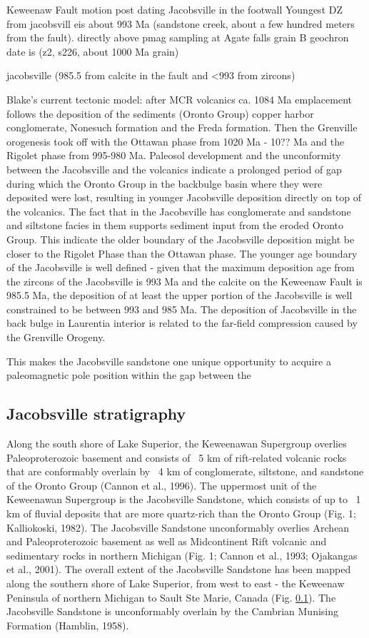\documentclass[11pt,letterpaper]{article}
\begin{document}
Keweenaw Fault motion post dating Jacobsville in the footwall
Youngest DZ from jacobsvill eis about 993 Ma (sandstone creek, about a few hundred meters from the fault). 
directly above pmag sampling at Agate falls grain B geochron date is (z2, s226, about 1000 Ma grain)

jacobsville (985.5 from calcite in the fault and <993 from zircons) 

Blake's current tectonic model: after MCR volcanics ca. 1084 Ma emplacement follows the deposition of the sediments (Oronto Group) copper harbor conglomerate, Nonesuch formation and the Freda formation. Then the Grenville orogenesis took off with the Ottawan phase from 1020 Ma - 10?? Ma and the Rigolet phase from 995-980 Ma. Paleosol development and the unconformity between the Jacobsville and the volcanics indicate a prolonged period of gap during which the Oronto Group in the backbulge basin where they were deposited were lost, resulting in younger Jacobsville deposition directly on top of the volcanics. The fact that in the Jacobsville has conglomerate and sandstone and siltstone facies in them supports sediment input from the eroded Oronto Group. This indicate the older boundary of the Jacobsville deposition might be closer to the Rigolet Phase than the Ottawan phase. The younger age boundary of the Jacobsville is well defined - given that the maximum deposition age from the zircons of the Jacobsville is 993 Ma and the calcite on the Keweenaw Fault is 985.5 Ma, the deposition of at least the upper portion of the Jacobsville is well constrained to be between 993 and 985 Ma. The deposition of Jacobsville in the back bulge in Laurentia interior is related to the far-field compression caused by the Grenville Orogeny. 

This makes the Jacobsville sandstone one unique opportunity to acquire a paleomagnetic pole position within the gap between the 

\subsection{Jacobsville stratigraphy}

Along the south shore of Lake Superior, the Keweenawan Supergroup overlies Paleoproterozoic basement and consists of ~5 km of rift-related volcanic rocks that are conformably overlain by ~4 km of conglomerate, siltstone, and sandstone of the Oronto Group (Cannon et al., 1996). The uppermost unit of the Keweenawan Supergroup is the Jacobsville Sandstone, which consists of up to ~1 km of fluvial deposits that are more quartz-rich than the Oronto Group (Fig. 1; Kalliokoski, 1982). The Jacobsville Sandstone unconformably overlies Archean and Paleoproterozoic basement as well as Midcontinent Rift volcanic and sedimentary rocks in northern Michigan (Fig. 1; Cannon et al., 1993; Ojakangas et al., 2001). The overall extent of the Jacobsville Sandstone has been mapped along the southern shore of Lake Superior, from west to east - the Keweenaw Peninsula of northern Michigan to Sault Ste Marie, Canada (Fig. \ref{}). The Jacobsville Sandstone is unconformably overlain by the Cambrian Munising Formation (Hamblin, 1958).
\end{document}
